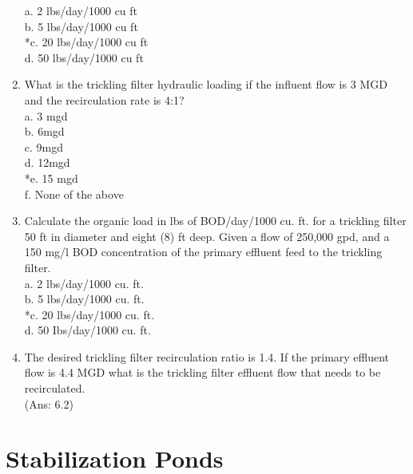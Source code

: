 \begin{enumerate}
 a. 2 lbs/day/1000 cu ft \\
 b. 5 lbs/day/1000 cu ft \\
 *c. 20 lbs/day/1000 cu ft \\
 d. 50 lbs/day/1000 cu ft \\

\item  What is the trickling filter hydraulic loading if the influent flow is 3 MGD and the recirculation rate is 4:1? \\

 a. 3 mgd \\
 b. 6mgd \\
 c. 9mgd \\
 d. 12mgd \\
 *e. 15 mgd \\
 f. None of the above \\


\item  Calculate the organic load in lbs of BOD/day/1000 cu. ft. for a trickling filter 50 ft in diameter and eight (8) ft deep.  Given a flow of 250,000 gpd, and a 150 mg/l BOD concentration of the primary effluent feed to the trickling filter. \\

 a. 2 lbs/day/1000 cu. ft. \\
 b. 5 lbs/day/1000 cu. ft. \\
 *c. 20 lbs/day/1000 cu. ft. \\
 d. 50 Ibs/day/1000 cu. ft. \\

\item  The desired trickling filter recirculation ratio is 1.4.  If the primary effluent flow is 4.4 MGD what is the trickling filter effluent flow that needs to be recirculated. \\ (Ans: 6.2)


\end{enumerate}

\section*{Stabilization Ponds}

